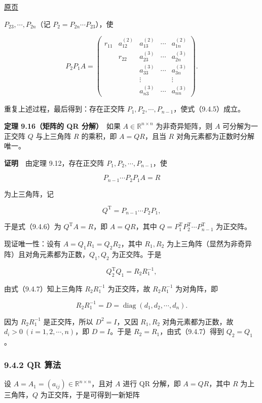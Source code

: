 \documentclass[
  10pt,
  fontset=fandol]{ctexart}
\begin{document}
\href{../../source-images/pdf-252.jpeg}{原页}

\(P_{23},\cdots,P_{2n}\)（记 \(P_2=P_{2n}\cdots P_{23}\)），使

\[
P_2P_1A=\begin{pmatrix}
r_{11}&a_{12}^{(2)}&a_{13}^{(2)}&\cdots&a_{1n}^{(2)}\\
&r_{22}&a_{23}^{(3)}&\cdots&a_{2n}^{(3)}\\
&&a_{33}^{(3)}&\cdots&a_{3n}^{(3)}\\
&&\vdots&&\vdots\\
&&a_{n3}^{(3)}&\cdots&a_{nn}^{(3)}
\end{pmatrix}.
\]

重复上述过程，最后得到：存在正交阵 \(P_1,P_2,\cdots,P_{n-1}\)，使式（9.4.5）成立。

\textbf{定理 9.16（矩阵的 QR 分解）}　如果 \(A\in\mathbb R^{n\times n}\) 为非奇异矩阵，则 \(A\) 可分解为一正交阵 \(Q\) 与上三角阵 \(R\) 的乘积，即 \(A=QR\)，且当 \(R\) 对角元素都为正数时分解唯一。

\textbf{证明}　由定理 9.12，存在正交阵 \(P_1,P_2,\cdots,P_{n-1}\)，使

\[
P_{n-1}\cdots P_2P_1A=R
\tag{9.4.6}
\]

为上三角阵，记

\[
Q^{\mathrm T}=P_{n-1}\cdots P_2P_1,
\]

于是式（9.4.6）为 \(Q^{\mathrm T}A=R\)，即 \(A=QR\)，其中 \(Q=P_1^{\mathrm T}P_2^{\mathrm T}\cdots P_{n-1}^{\mathrm T}\) 为正交阵。

现证唯一性：设有 \(A=Q_1R_1=Q_2R_2\)，其中 \(R_1,R_2\) 为上三角阵（显然为非奇异阵）且对角元素都为正数，\(Q_1,Q_2\) 为正交阵。于是

\[
Q_2^{\mathrm T}Q_1=R_2R_1^{-1},
\tag{9.4.7}
\]

由式（9.4.7）知上三角阵 \(R_2R_1^{-1}\) 为正交阵，故 \(R_2R_1^{-1}\) 为对角阵，即

\[
R_2R_1^{-1}=D=\operatorname{diag}(d_1,d_2,\cdots,d_n).
\]

因为 \(R_2R_1^{-1}\) 是正交阵，所以 \(D^2=I\)，又因 \(R_1,R_2\) 对角元素都为正数，故 \(d_i>0\ (i=1,2,\cdots,n)\)，即 \(D=I\)。于是 \(R_2=R_1\)，由式（9.4.7）得到 \(Q_2=Q_1\)。

\subsubsection{9.4.2 QR 算法}\label{qr-ux7b97ux6cd5-1}

设 \(A=A_1=(a_{ij})\in\mathbb R^{n\times n}\)，且对 \(A\) 进行 QR 分解，即 \(A=QR\)，其中 \(R\) 为上三角阵，\(Q\) 为正交阵，于是可得到一新矩阵
\end{document}

